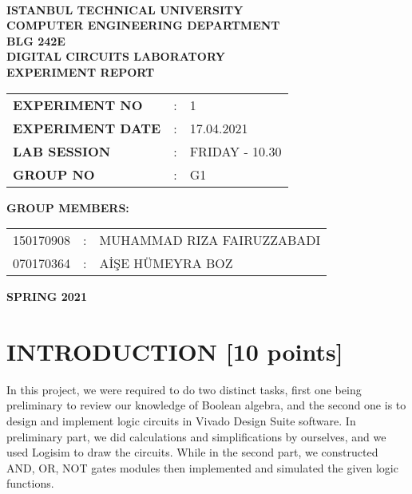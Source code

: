 \documentclass[pdftex,12pt,a4paper]{article}
\begin{document}
\begin{titlepage}
\begin{center}
\textbf{}\\
\textbf{\Large{ISTANBUL TECHNICAL UNIVERSITY}}\\
\vspace{0.5cm}
\textbf{\Large{COMPUTER ENGINEERING DEPARTMENT}}\\
\vspace{2cm}
\textbf{\Large{BLG 242E\\ DIGITAL CIRCUITS LABORATORY\\ EXPERIMENT REPORT}}\\
\vspace{2.8cm}
\begin{table}[ht]
\centering
\Large{
\begin{tabular}{lcl}
\textbf{EXPERIMENT NO}  & : & 1 \\
\textbf{EXPERIMENT DATE}  & : & 17.04.2021 \\
\textbf{LAB SESSION}  & : & FRIDAY - 10.30 \\
\textbf{GROUP NO}  & : & G1 \\
\end{tabular}}
\end{table}
\vspace{1cm}
\textbf{\Large{GROUP MEMBERS:}}\\
\begin{table}[ht]
\centering
\Large{
\begin{tabular}{rcl}
150170908  & : & MUHAMMAD RIZA FAIRUZZABADI \\
070170364  & : & AİŞE HÜMEYRA BOZ \\
\end{tabular}}
\end{table}
\vspace{2.8cm}
\textbf{\Large{SPRING 2021}}

\end{center}

\end{titlepage}

\thispagestyle{empty}
\setcounter{tocdepth}{4}
\tableofcontents
\clearpage

\setcounter{page}{1}

\section{INTRODUCTION [10 points]}
In this project, we were required to do two distinct tasks, first one being preliminary to review our knowledge of Boolean algebra, and the second one is to design and implement logic circuits in Vivado Design Suite software. In preliminary part, we did calculations and simplifications by ourselves, and we used Logisim to draw the circuits. While in the second part, we constructed AND, OR, NOT gates modules then implemented and simulated the given logic functions.
\end{document}
